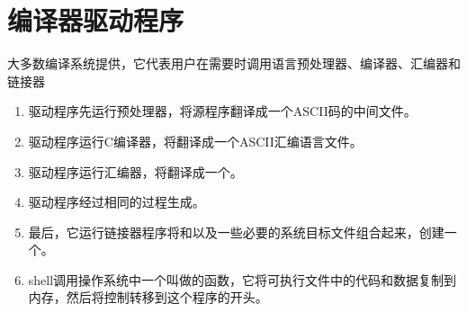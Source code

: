 
\section{编译器驱动程序}
{
    大多数编译系统提供，它代表用户在需要时调用语言预处理器、编译器、汇编器和链接器

    \begin{enumerate}
        \item 驱动程序先运行预处理器，将源程序翻译成一个ASCII码的中间文件。
        \item 驱动程序运行C编译器，将翻译成一个ASCII汇编语言文件。
        \item 驱动程序运行汇编器，将翻译成一个。
        \item 驱动程序经过相同的过程生成。
        \item 最后，它运行链接器程序将和以及一些必要的系统目标文件组合起来，创建一个。
        \item shell调用操作系统中一个叫做的函数，它将可执行文件中的代码和数据复制到内存，然后将控制转移到这个程序的开头。
    \end{enumerate}
}
